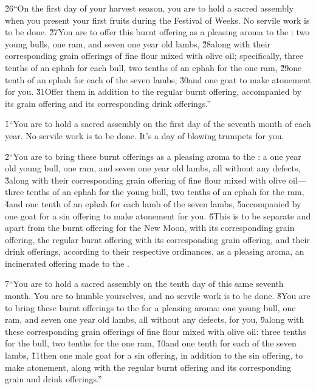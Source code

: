\v{26}``On the first day of your harvest season, you are to hold a sacred assembly when you present your first fruits during the Festival of Weeks. No servile work is to be done. \v{27}You are to offer this burnt offering as a pleasing aroma to the : two young bulls, one ram, and seven one year old lambs, \v{28}along with their corresponding grain offerings of fine flour mixed with olive oil; specifically, three tenths of an ephah for each bull, two tenths of an ephah for the one ram, \v{29}one tenth of an ephah for each of the seven lambs, \v{30}and one goat to make atonement for you. \v{31}Offer them in addition to the regular burnt offering, accompanied by its grain offering and its corresponding drink offerings.''

\v{1}``You are to hold a sacred assembly on the first day of the seventh month of each year. No servile work is to be done. It's a day of blowing trumpets for you.

\v{2}``You are to bring these burnt offerings as a pleasing aroma to the : a one year old young bull, one ram, and seven one year old lambs, all without any defects, \v{3}along with their corresponding grain offering of fine flour mixed with olive oil---three tenths of an ephah for the young bull, two tenths of an ephah for the ram, \v{4}and one tenth of an ephah for each lamb of the seven lambs, \v{5}accompanied by one goat for a sin offering to make atonement for you. \v{6}This is to be separate and apart from the burnt offering for the New Moon, with its corresponding grain offering, the regular burnt offering with its corresponding grain offering, and their drink offerings, according to their respective ordinances, as a pleasing aroma, an incinerated offering made to the .

\v{7}``You are to hold a sacred assembly on the tenth day of this same seventh month. You are to humble yourselves, and no servile work is to be done. \v{8}You are to bring these burnt offerings to the  for a pleasing aroma: one young bull, one ram, and seven one year old lambs, all without any defects, for you, \v{9}along with these corresponding grain offerings of fine flour mixed with olive oil: three tenths for the bull, two tenths for the one ram, \v{10}and one tenth for each of the seven lambs, \v{11}then one male goat for a sin offering, in addition to the sin offering, to make atonement, along with the regular burnt offering and its corresponding grain and drink offerings.''

